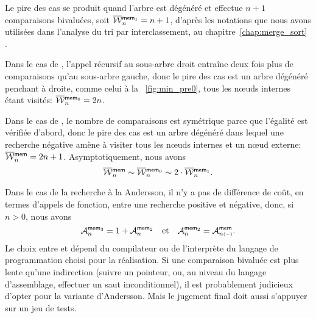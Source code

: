 Le pire des cas se produit quand l'arbre est dégénéré et  effectue \(n+1\)
comparaisons bivaluées, soit \(\OW{\fun{mem}_1}{n} = n +
1\), d'après les notations que nous
avons utilisées dans l'analyse du tri par interclassement, au chapitre~\ref{chap:merge_sort}
.

Dans le cas de , l'appel récursif au sous-arbre droit
entraîne deux fois plus de comparaisons qu'au sous-arbre gauche, donc
le pire des cas est un arbre dégénéré penchant à droite, comme celui à
la \fig~\vref{fig:min_pre0}, tous les n{\oe}uds internes étant
visités: \(\OW{\fun{mem}_0}{n} = 2n\).

Dans le cas de , le nombre de comparaisons est symétrique
parce que l'égalité est vérifiée d'abord, donc le pire des cas est un
arbre dégénéré dans lequel une recherche négative amène à visiter tous
les n{\oe}uds internes et un n{\oe}ud externe: \(\OW{\fun{mem}}{n} =
2n + 1\). Asymptotiquement, nous avons
\begin{equation*}
\OW{\fun{mem}}{n} \sim \OW{\fun{mem}_0}{n}
\sim 2 \cdot \OW{\fun{mem}_1}{n}.
\end{equation*}

Dans le cas de la recherche à la Andersson, il n'y a pas de différence
de coût, en termes d'appels de fonction, entre une recherche positive
et négative, donc, si \(n > 0\), nous avons
\begin{equation}
\M{\fun{mem}_3}{n} = 1 + \M{\fun{mem}_2}{n}\quad\text{et}\quad
\M{\fun{mem}_2}{n} = \M{\fun{mem}}{n{\scriptscriptstyle (-)}}.
\label{eq_Andersson_average}
\index{mem3@$\M{\fun{mem}_3}{n}$}\index{mem2@$\M{\fun{mem}_2}{n}$}
\end{equation}
Le choix entre  et  dépend du
compilateur ou de l'interprète du langage de programmation choisi pour
la réalisation. Si une comparaison bivaluée est plus lente qu'une
indirection (suivre un pointeur, ou, au niveau du langage
d'assemblage, effectuer un saut inconditionnel), il est probablement
judicieux d'opter pour la variante d'Andersson. Mais le jugement final
doit aussi s'appuyer sur un jeu de tests.

